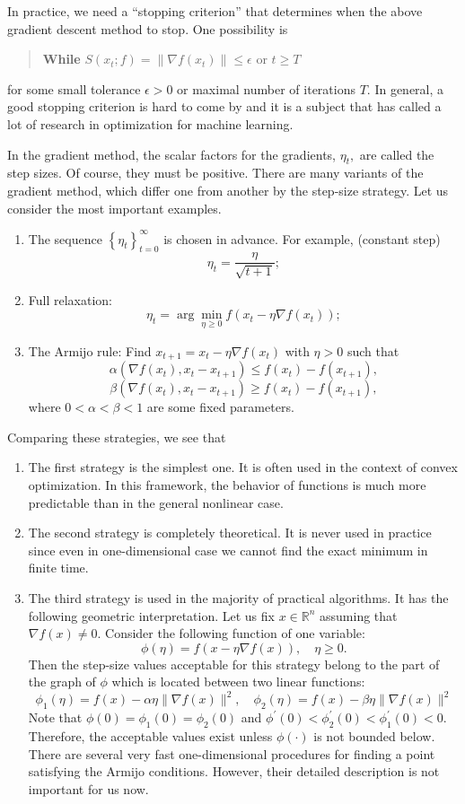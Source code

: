 In practice, we need a ``stopping criterion'' that determines when the above gradient descent
method to stop.  One possibility is 
\begin{quote}
	{\bf While} $S(x_t; f) = \|\nabla f(x_t)\|\le \epsilon$ or $t \ge T$  
\end{quote}
for some small tolerance $\epsilon>0$ or maximal number of iterations
$T$.   In general, a good stopping criterion is hard to come by and it
is a subject that has called a lot of research in optimization for
machine learning. 

In the gradient method, the scalar factors for the gradients, $\eta_{t},$ are called the step sizes. Of course, they must be positive. There are many variants of the gradient method, which differ one from another by the step-size strategy. Let us consider the most important examples.
\begin{enumerate}
\item The sequence $\left\{\eta_t\right\}_{t=0}^{\infty}$ is chosen in advance. For example,
(constant step)
$$
\eta_t=\frac{\eta}{\sqrt{t+1}};
$$
\item Full relaxation:
$$
\eta_t=\arg \min _{\eta \geq 0} f\left(x_t-\eta \nabla f\left(x_t\right)\right);
$$
\item The Armijo rule: Find $x_{t+1}=x_t-\eta \nabla f\left(x_t\right)$ with $\eta>0$ such that
$$
\alpha\left(\nabla f\left(x_t\right), x_t-x_{t+1}\right) \leq f\left(x_t\right)-f\left(x_{t+1}\right),
$$
$$
\beta\left(\nabla f\left(x_t\right), x_t-x_{t+1}\right) \geq f\left(x_t\right)-f\left(x_{t+1}\right),
$$
where $0<\alpha<\beta<1$ are some fixed parameters.
\end{enumerate}
Comparing these strategies, we see that 
\begin{enumerate}
\item The first strategy is the simplest one. It is often used in the context of convex optimization. In this framework, the behavior of functions is much more predictable than in the general nonlinear case.
\item The second strategy is completely theoretical. It is never used in practice since even in one-dimensional case we cannot find the exact minimum in finite time.
\item The third strategy is used in the majority of practical algorithms. It has the following geometric interpretation. Let us fix $x \in \mathbb{R}^{n}$ assuming that $\nabla f(x) \neq 0$. Consider the following function of one variable:
$$
\phi (\eta)=f(x-\eta \nabla f(x)),\quad \eta\ge0.
$$
Then the step-size values acceptable for this strategy belong to the part of the graph of $\phi$ which is located between two linear functions:
$$
\phi_{1}(\eta)=f(x)-\alpha \eta\|\nabla f(x)\|^{2}, \quad \phi_{2}(\eta)=f(x)-\beta \eta\|\nabla f(x)\|^{2}
$$
Note that $\phi(0)=\phi_{1}(0)=\phi_{2}(0)$ and $\phi^{\prime}(0)<\phi_{2}^{\prime}(0)<\phi_{1}^{\prime}(0)<0 .$ Therefore, the
acceptable values exist unless $\phi(\cdot)$ is not bounded below. There are several very fast one-dimensional procedures for finding a point satisfying the Armijo conditions. However, their detailed description is not important for us now.
\end{enumerate}
